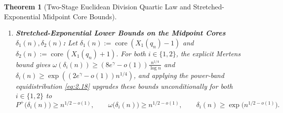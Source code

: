 \documentclass[11pt,reqno]{amsart}
\newtheorem{theorem}{Theorem}[section]
\theoremstyle{remark}
\numberwithin{equation}{section}
\DeclareMathOperator{\core}{core}
\begin{document}
\begin{theorem}[{Two-Stage Euclidean Division Quartic Law and Stretched-Exponential Midpoint Core Bounds}]
\begin{enumerate}
\begin{equation}
\end{equation}
with unconditional Euclidean quotient-remainder locks:
\begin{equation}\label{eq:4.13}
\left\lfloor \frac{B_+ R_n}{B_-} \right\rfloor = Z_-^4, \qquad \left\lceil \frac{B_- R_n}{B_+} \right\rceil = Z_+^4.
\end{equation}
\item[(iii)] \textbf{Stretched-Exponential Lower Bounds on the Midpoint Cores $\delta_1(n), \delta_2(n)$:} Let $\delta_1(n) := \core(X_1(q_n) - 1)$ and $\delta_2(n) := \core(X_1(q_n) + 1)$. For both $i \in \{1, 2\}$, the explicit Mertens bound gives $\omega(\delta_i(n)) \ge (8e^\gamma - o(1))\frac{n^{1/4}}{\log n}$ and $\delta_i(n) \ge \exp((2e^\gamma - o(1))n^{1/4})$, and applying the power-band equidistribution \eqref{eq:2.18} upgrades these bounds unconditionally for both $i \in \{1, 2\}$ to
\begin{equation}\label{eq:4.14}
P^+\bigl(\delta_i(n)\bigr) \ge n^{1/2-o(1)}, \qquad \omega\bigl(\delta_i(n)\bigr) \ge n^{1/2-o(1)}, \qquad \delta_i(n) \ge \exp\bigl(n^{1/2-o(1)}\bigr).
\end{equation}
\end{enumerate}
\end{theorem}
\end{document}
